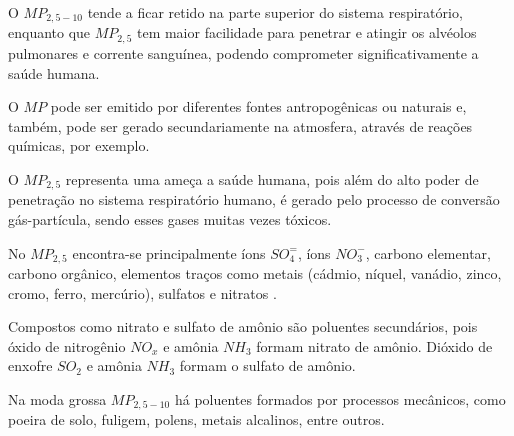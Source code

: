 O $MP_{2,5-10}$ tende a ficar retido na parte superior do sistema respiratório, 
enquanto que $MP_{2,5}$ tem maior facilidade para penetrar e atingir 
os alvéolos pulmonares e corrente sanguínea, 
podendo comprometer significativamente a saúde humana. 

O $MP$ pode ser emitido por diferentes fontes antropogênicas ou naturais e, 
também, pode ser gerado secundariamente na atmosfera, através de 
reações químicas, por exemplo. 

O $MP_{2,5}$ representa uma ameça a saúde humana, pois além 
do alto poder de penetração no sistema respiratório humano,
é gerado pelo processo de conversão gás-partícula, sendo esses 
gases muitas vezes tóxicos.

No $MP_{2,5}$ encontra-se principalmente íons $SO_4^=$, 
íons $ NO_3^-$, carbono elementar, carbono orgânico, 
elementos traços como metais 
(cádmio, níquel, vanádio, zinco, cromo, ferro, mercúrio), 
sulfatos e nitratos \citep{finlayson1999}. 

Compostos como nitrato e sulfato de amônio são poluentes secundários,
pois óxido de nitrogênio $NO_x$ e amônia $NH_3$ formam nitrato de amônio. 
Dióxido de enxofre $SO_2$ e amônia $NH_3$ formam o sulfato de amônio. 

Na moda grossa $MP_{2,5-10}$ há poluentes formados por processos mecânicos, 
como poeira de solo, fuligem, polens, metais alcalinos, entre outros. 



